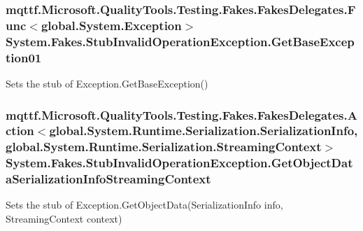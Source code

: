 \hypertarget{class_system_1_1_fakes_1_1_stub_invalid_operation_exception_ad5d5b823c6a05b092965f70314c3b02c}{
\subsubsection[{Get\-Base\-Exception01}]{\setlength{\rightskip}{0pt plus 5cm}mqttf.\-Microsoft.\-Quality\-Tools.\-Testing.\-Fakes.\-Fakes\-Delegates.\-Func$<$global.\-System.\-Exception$>$ System.\-Fakes.\-Stub\-Invalid\-Operation\-Exception.\-Get\-Base\-Exception01}}\label{class_system_1_1_fakes_1_1_stub_invalid_operation_exception_ad5d5b823c6a05b092965f70314c3b02c}


Sets the stub of Exception.\-Get\-Base\-Exception()

\hypertarget{class_system_1_1_fakes_1_1_stub_invalid_operation_exception_ab1526e7a90f9fe42f805a8c96426de11}{
\subsubsection[{Get\-Object\-Data\-Serialization\-Info\-Streaming\-Context}]{\setlength{\rightskip}{0pt plus 5cm}mqttf.\-Microsoft.\-Quality\-Tools.\-Testing.\-Fakes.\-Fakes\-Delegates.\-Action$<$global.\-System.\-Runtime.\-Serialization.\-Serialization\-Info, global.\-System.\-Runtime.\-Serialization.\-Streaming\-Context$>$ System.\-Fakes.\-Stub\-Invalid\-Operation\-Exception.\-Get\-Object\-Data\-Serialization\-Info\-Streaming\-Context}}\label{class_system_1_1_fakes_1_1_stub_invalid_operation_exception_ab1526e7a90f9fe42f805a8c96426de11}


Sets the stub of Exception.\-Get\-Object\-Data(\-Serialization\-Info info, Streaming\-Context context)

